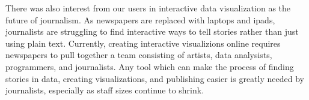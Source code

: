 There was also interest from our users in interactive data visualization as the future of journalism. 
As newspapers are replaced with laptops and ipads, journalists are struggling to find interactive ways to tell stories rather than just using plain text. 
Currently, creating interactive visualizions online requires newspapers to pull together a team consisting of artists, data analysists, programmers, and journalists. 
Any tool which can make the process of finding stories in data, creating visualizations, and publishing easier is greatly needed by journalists, especially as staff sizes continue to shrink.
